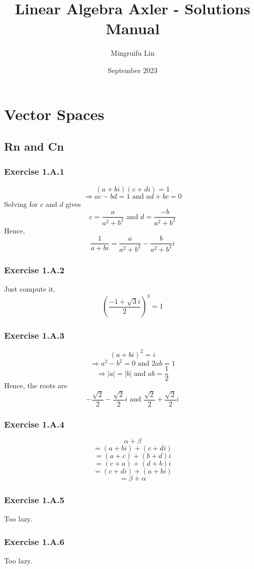\documentclass{book}
\title{Linear Algebra Axler - Solutions Manual}
\author{Mingruifu Lin}
\date{September 2023}
\begin{document}
\maketitle

\tableofcontents

\chapter{Vector Spaces}

\section{Rn and Cn}

\subsection*{Exercise 1.A.1}
$$(a + bi)(c + di) = 1$$
$$\Rightarrow ac - bd = 1 \text{ and } ad + bc = 0$$
Solving for $c$ and $d$ gives
$$c = \frac{a}{a^2 + b^2} \text{ and } d = \frac{-b}{a^2 + b^2}$$
Hence,
$$\frac{1}{a + bi} = \frac{a}{a^2 + b^2} - \frac{b}{a^2 + b^2}i$$

\subsection*{Exercise 1.A.2}
Just compute it.
$$\left(\frac{-1 + \sqrt{3}i}{2}\right)^3 = 1$$

\subsection*{Exercise 1.A.3}
$$(a + bi)^2 = i$$
$$\Rightarrow a^2 - b^2 = 0 \text{ and } 2ab = 1$$
$$\Rightarrow |a| = |b| \text{ and } ab = \frac{1}{2}$$
Hence, the roots are
$$-\frac{\sqrt{2}}{2} - \frac{\sqrt{2}}{2}i \text{ and } \frac{\sqrt{2}}{2} + \frac{\sqrt{2}}{2}i$$

\subsection*{Exercise 1.A.4}
$$\alpha + \beta$$
$$= (a + bi) + (c + di)$$
$$= (a + c) + (b + d)i$$
$$= (c + a) + (d + b)i$$
$$= (c + di) + (a + bi)$$
$$= \beta + \alpha$$

\subsection*{Exercise 1.A.5}
Too lazy.

\subsection*{Exercise 1.A.6}
Too lazy.
\end{document}
